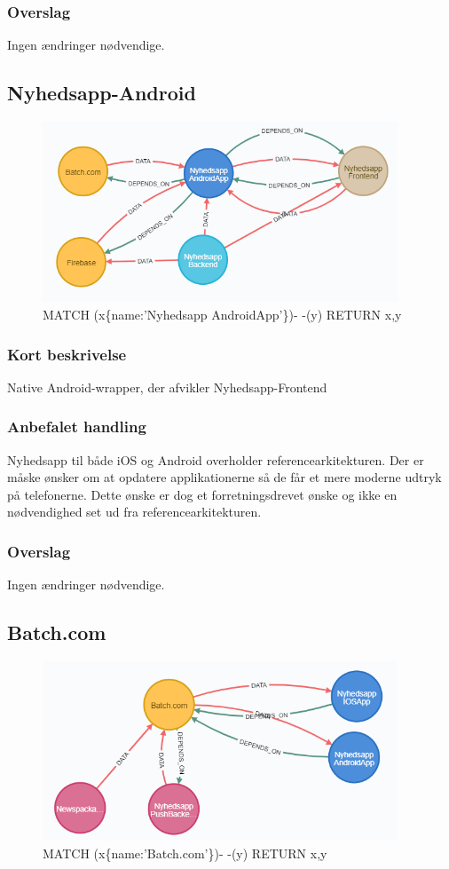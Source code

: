 \documentclass{article}
\begin{document}
\subsubsection{Overslag}
Ingen ændringer nødvendige.

\subsection{Nyhedsapp-Android}
\begin{figure}[h]
\includegraphics[width=300pt]{Nyhedsapp-Android.PNG}
\caption{MATCH (x\{name:'Nyhedsapp AndroidApp'\})- -(y) RETURN x,y}
\end{figure}
\subsubsection{Kort beskrivelse}
Native Android-wrapper, der afvikler Nyhedsapp-Frontend
\subsubsection{Anbefalet handling}
Nyhedsapp til både iOS og Android overholder referencearkitekturen. Der er måske ønsker om at opdatere applikationerne så de får et mere moderne udtryk på telefonerne. Dette ønske er dog et forretningsdrevet ønske og ikke en nødvendighed set ud fra referencearkitekturen.
\subsubsection{Overslag}
Ingen ændringer nødvendige.


\subsection{Batch.com}
\begin{figure}[h]
\includegraphics[width=300pt]{Batch-com.PNG}
\caption{MATCH (x\{name:'Batch.com'\})- -(y) RETURN x,y}
\end{figure}
\end{document}
